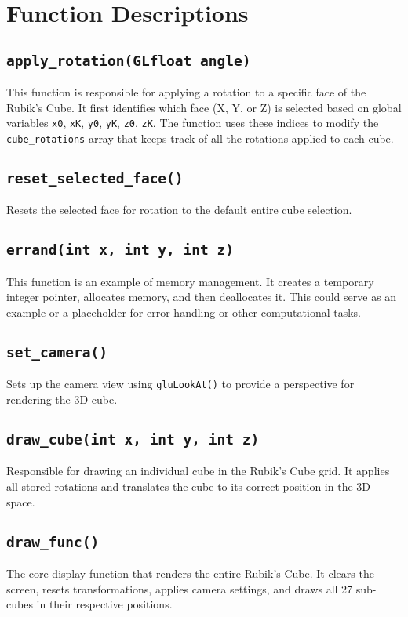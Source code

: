 \documentclass{article}
\begin{document}
\section{Function Descriptions}

\subsection{\texttt{apply\_rotation(GLfloat angle)}}
This function is responsible for applying a rotation to a specific face of the Rubik's Cube. It first identifies which face (X, Y, or Z) is selected based on global variables \texttt{x0}, \texttt{xK}, \texttt{y0}, \texttt{yK}, \texttt{z0}, \texttt{zK}. The function uses these indices to modify the \texttt{cube\_rotations} array that keeps track of all the rotations applied to each cube.

\subsection{\texttt{reset\_selected\_face()}}
Resets the selected face for rotation to the default entire cube selection.

\subsection{\texttt{errand(int x, int y, int z)}}
This function is an example of memory management. It creates a temporary integer pointer, allocates memory, and then deallocates it. This could serve as an example or a placeholder for error handling or other computational tasks.

\subsection{\texttt{set\_camera()}}
Sets up the camera view using \texttt{gluLookAt()} to provide a perspective for rendering the 3D cube.

\subsection{\texttt{draw\_cube(int x, int y, int z)}}
Responsible for drawing an individual cube in the Rubik's Cube grid. It applies all stored rotations and translates the cube to its correct position in the 3D space.

\subsection{\texttt{draw\_func()}}
The core display function that renders the entire Rubik's Cube. It clears the screen, resets transformations, applies camera settings, and draws all 27 sub-cubes in their respective positions.
\end{document}
